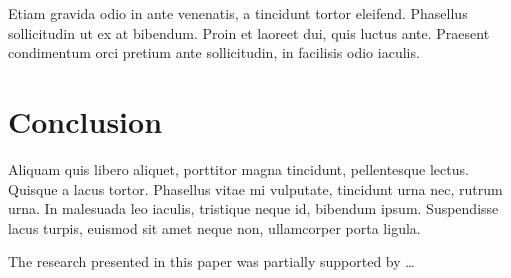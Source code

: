 \documentclass[10pt]{article}
\begin{document}
Etiam gravida odio in ante venenatis, a tincidunt tortor eleifend. Phasellus sollicitudin ut ex at bibendum. Proin et laoreet dui, quis luctus ante. Praesent condimentum orci pretium ante sollicitudin, in facilisis odio iaculis. 


\section{Conclusion}

Aliquam quis libero aliquet, porttitor magna tincidunt, pellentesque lectus. Quisque a lacus tortor. Phasellus vitae mi vulputate, tincidunt urna nec, rutrum urna. In malesuada leo iaculis, tristique neque id, bibendum ipsum. Suspendisse lacus turpis, euismod sit amet neque non, ullamcorper porta ligula.

\begin{acknowledgements}
 The research presented in this paper was partially supported by \ldots
\end{acknowledgements}

\nocite{*} %



\end{document}
